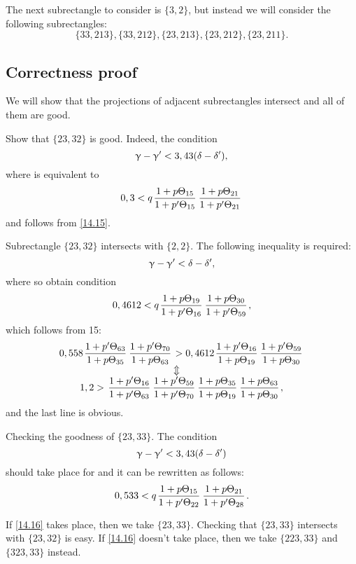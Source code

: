The next subrectangle to consider is $\{3,2\}$, but instead we will consider the following subrectangles:
\begin{equation*}
	\{33, 213\}, \{33, 212\}, \{23, 213\}, \{23, 212\}, \{23, 211\}.
\end{equation*}

\subsection{Correctness proof}

We will show that the projections of adjacent subrectangles intersect and all of them are good.

Show that $\{23,32\}$ is good.
Indeed, the condition
\begin{equation*}
	\upgamma - \upgamma' < 3,43(\delta - \delta'),
\end{equation*}
where
is equivalent to
\begin{equation*}
	0,3 < q \up{15}{15} \up{21}{21}
\end{equation*}
and follows from \ref{14.15}.

Subrectangle $\{23, 32\}$ intersects with $\{2,2\}$. The following inequality is required:
\begin{equation*}
	\upgamma - \upgamma' < \delta - \delta',
\end{equation*}
where
so obtain condition
\begin{equation*}
	0,4612 < q \up{19}{16} \up{30}{59},
\end{equation*}
which follows from 15:
\begin{gather*}
	0,558 \pu{63}{35} \pu{70}{63} > 0,4612 \pu{16}{19} \pu{59}{30}\\
	\ArrowBetweenLines
	1,2 > \pp{16}{63} \pp{59}{70} \uu{35}{19} \uu{63}{30},
\end{gather*}
and the last line is obvious.

Checking the goodness of $\{23, 33\}$.
The condition
\begin{equation*}
	\upgamma - \upgamma' < 3,43(\delta - \delta')
\end{equation*}
should take place for
and it can be rewritten as follows:
\begin{equation}\label{14.16}
	0,533 < q \up{15}{22} \up{21}{28}.
\end{equation}

If \ref{14.16} takes place, then we take $\{23, 33\}$.
Checking that $\{23, 33\}$ intersects with $\{23, 32\}$ is easy.
If \ref{14.16} doesn't take place, then we take $\{223, 33\}$ and $\{323, 33\}$ instead.

